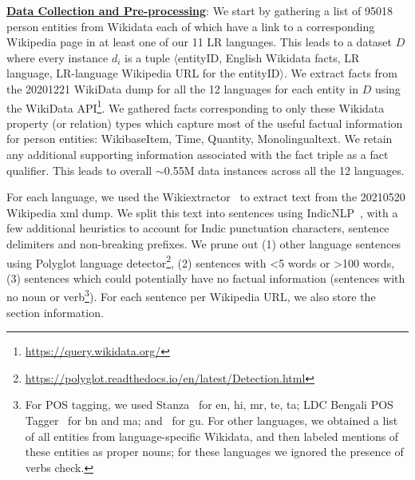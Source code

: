 \documentclass[runningheads]{llncs}
\begin{document}
\noindent\underline{\textbf{Data Collection and Pre-processing}}: 
We start by gathering a list of 95018 person entities from Wikidata each of which have a link to a corresponding Wikipedia page in at least one of our 11 LR languages. This leads to a dataset $D$ where every instance $d_i$ is a tuple $\langle$entityID, English Wikidata facts, LR language, LR-language Wikipedia URL for the entityID$\rangle$.
We extract facts from the 20201221 WikiData dump for all the 12 languages for each entity in $D$ using the WikiData API\footnote{\url{https://query.wikidata.org/}}. We gathered facts corresponding to only these Wikidata property (or relation) types which capture most of the useful factual information for person entities: WikibaseItem, Time, Quantity, Monolingualtext. We retain any additional supporting information associated with the fact triple as a fact qualifier. This leads to overall $\sim$0.55M data instances across all the 12 languages. 

For each language, we used the Wikiextractor~\cite{Wikiextractor2015} to extract text from the 20210520 Wikipedia xml dump. We split this text into sentences using IndicNLP~\cite{kakwani2020indicnlpsuite}, with a few additional heuristics to account for Indic punctuation characters, sentence delimiters and non-breaking prefixes. We prune out (1) other language sentences using Polyglot language detector\footnote{\url{https://polyglot.readthedocs.io/en/latest/Detection.html}}, (2) sentences with <5 words or >100 words, (3) sentences which could potentially have no factual information (sentences with no noun or verb\footnote{For POS tagging, we used Stanza~\cite{qi2020stanza} for en, hi, mr, te, ta; LDC Bengali POS Tagger~\cite{bali2010indian} for bn and ma; and~\cite{patel2008part} for gu. For other languages, we obtained a list of all entities from language-specific Wikidata, and then labeled mentions of these entities as proper nouns; for these languages we ignored the presence of verbs check.}). For each sentence per Wikipedia URL, we also store the section information.
\end{document}
